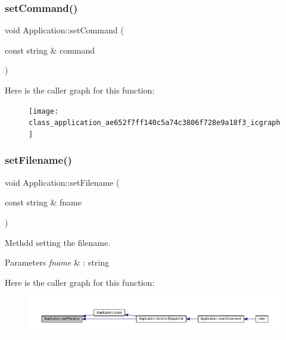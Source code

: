 \subsubsection{\texorpdfstring{set\+Command()}{setCommand()}}
{\footnotesize\ttfamily void Application\+::set\+Command (\begin{DoxyParamCaption}\item[{const string \&}]{command }\end{DoxyParamCaption})}

Here is the caller graph for this function\+:\nopagebreak
\begin{figure}[H]
\begin{center}
\leavevmode
\texttt{[image: class\_application\_ae652f7ff140c5a74c3806f728e9a18f3\_icgraph]}
\end{center}
\end{figure}
\mbox{\label{class_application_a76de879568ee39ac80484441716928d2}} 
\subsubsection{\texorpdfstring{set\+Filename()}{setFilename()}}
{\footnotesize\ttfamily void Application\+::set\+Filename (\begin{DoxyParamCaption}\item[{const string \&}]{fname }\end{DoxyParamCaption})}

Methdd setting the filename. 
\begin{DoxyParams}{Parameters}
{\em fname} & \+: string \\
\hline
\end{DoxyParams}
Here is the caller graph for this function\+:\nopagebreak
\begin{figure}[H]
\begin{center}
\leavevmode
\includegraphics[width=350pt]{class_application_a76de879568ee39ac80484441716928d2_icgraph}
\end{center}
\end{figure}
\mbox{\label{class_application_a56b4a55e9eabd40b7f0033ba39631ebe}} 
